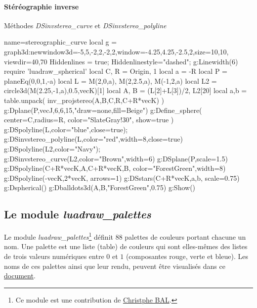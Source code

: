 \paragraph{Stéréographie inverse}

\begin{demo}{Méthodes \emph{DSinvstereo\_curve} et \emph{DSinvstereo\_polyline}}
\begin{luadraw}{name=stereographic_curve}
local g = graph3d:new{window3d={-5,5,-2,2,-2,2},window={-4.25,4.25,-2.5,2},size={10,10}, viewdir={40,70}}
Hiddenlines = true; Hiddenlinestyle="dashed"; g:Linewidth(6)
require 'luadraw_spherical'
local C, R = Origin, 1
local a = -R
local P = planeEq(0,0,1,-a)
local L = {M(2,0,a), M(2,2.5,a), M(-1,2,a)}
local L2 = circle3d(M(2.25,-1,a),0.5,vecK)[1]
local A, B = (L[2]+L[3])/2, L2[20]
local a,b = table.unpack( inv_projstereo({A,B},{C,R},C+R*vecK) )
g:Dplane(P,vecJ,6,6,15,"draw=none,fill=Beige")
g:Define_sphere( {center=C,radius=R, color="SlateGray!30", show=true} )
g:DSpolyline(L,{color="blue",close=true}); g:DSinvstereo_polyline(L,{color="red",width=8,close=true})
g:DSpolyline(L2,{color="Navy"}); g:DSinvstereo_curve(L2,{color="Brown",width=6})
g:DSplane(P,{scale=1.5})
g:DSpolyline({{C+R*vecK,A},{C+R*vecK,B}}, {color="ForestGreen",width=8})
g:DSpolyline({{-vecK,2*vecK}}, {arrows=1})
g:DSstars({C+R*vecK,a,b}, {scale=0.75})
g:Dspherical()
g:Dballdots3d({A,B},"ForestGreen",0.75)
g:Show()
\end{luadraw}
\end{demo}


\subsection{Le module \emph{luadraw\_palettes}}

Le module \emph{luadraw\_palettes}\footnote{Ce module est une contribution de \href{https://github.com/projetmbc/for-writing/tree/main/palcol}{Christphe BAL}.} définit $88$ palettes de couleurs portant chacune un nom. Une palette est une liste (table) de couleurs qui sont elles-mêmes des listes de trois valeurs numériques entre $0$ et $1$ (composantes rouge, verte et bleue). Les noms de ces palettes ainsi que leur rendu, peuvent être visualisés dans ce \href{luadraw_palettes_doc.pdf}{document}.
